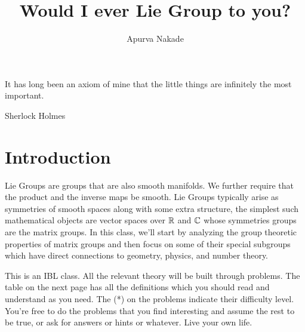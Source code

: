 
\usepackage{multirow}
\usepackage{array}

\title{Would I ever Lie Group to you?}
\author{\small{Apurva Nakade}}
\date{}

\maketitle
\tableofcontents
\vspace{2em}
\epigraph{It has long been an axiom of mine that the little things are infinitely the most important.}{Sherlock Holmes\\}

\section{Introduction}
\vspace{2em}

Lie Groups are groups that are also smooth manifolds. We further require that the product and the inverse maps be smooth. Lie Groups typically arise as symmetries of smooth spaces along with some extra structure, the simplest such mathematical objects are vector spaces over $\mathbb{R}$ and $\mathbb{C}$ whose symmetries groups are the matrix groups. In this class, we'll start by analyzing the group theoretic properties of matrix groups and then focus on some of their special subgroups which have direct connections to geometry, physics, and number theory.

This is an IBL class. All the relevant theory will be built through problems. The table on the next page has all the definitions which you should read and understand as you need. The (*) on the problems indicate their difficulty level. You're free to do the problems that you find interesting and assume the rest to be true, or ask for answers or hints or whatever. {Live your own life.}

